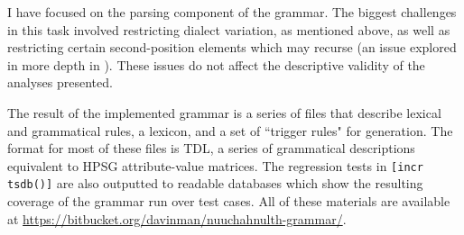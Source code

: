 I have focused on the parsing component of the grammar. The biggest challenges in this task involved restricting dialect variation, as mentioned above, as well as restricting certain second-position elements which may recurse (an issue explored in more depth in \citealt{bender2010reweaving}). These issues do not affect the descriptive validity of the analyses presented.


The result of the implemented grammar is a series of files that describe lexical and grammatical rules, a lexicon, and a set of ``trigger rules" for generation. The format for most of these files is TDL, a series of grammatical descriptions equivalent to HPSG attribute-value matrices. The regression tests in \texttt{[incr tsdb()]} \citep{oepen2001} are also outputted to readable databases which show the resulting coverage of the grammar run over test cases. All of these materials are available at \url{https://bitbucket.org/davinman/nuuchahnulth-grammar/}.


